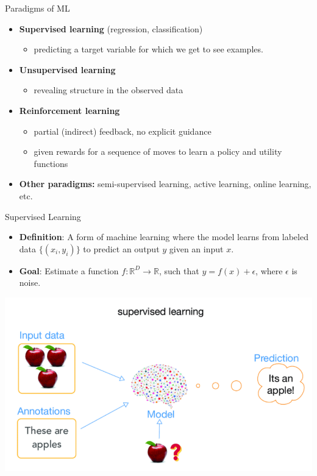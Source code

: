 \documentclass[serif, aspectratio=169]{beamer}
\begin{document}
\begin{frame}{Paradigms of ML}

\begin{minipage}{1.0\textwidth}
    \begin{itemize}
        \item \textbf{Supervised learning} (regression, classification)
        \begin{itemize}
            \item predicting a target variable for which we get to see examples.
        \end{itemize}
        \item \textbf{Unsupervised learning}
        \begin{itemize}
            \item revealing structure in the observed data
        \end{itemize}
        \item \textbf{Reinforcement learning}
        \begin{itemize}
            \item partial (indirect) feedback, no explicit guidance
            \item given rewards for a sequence of moves to learn a policy and utility functions
        \end{itemize}
        \item \textbf{Other paradigms:} semi-supervised learning, active learning, online learning, etc.
    \end{itemize}
\end{minipage}%
\end{frame}





\begin{frame}{Supervised Learning}
    \begin{itemize}
        \item \textbf{Definition}: A form of machine learning where the model learns from labeled data \( \{(x_i, y_i)\} \) to predict an output \( y \) given an input \( x \).
        \item \textbf{Goal}: Estimate a function \( f: \mathbb{R}^D \rightarrow \mathbb{R} \), such that \( y = f(x) + \epsilon \), where \( \epsilon \) is noise.
    \end{itemize}
     \begin{center}
        \includegraphics[width=0.6\linewidth]{pic/supervised.png}
    \end{center}
\end{frame}
\end{document}

